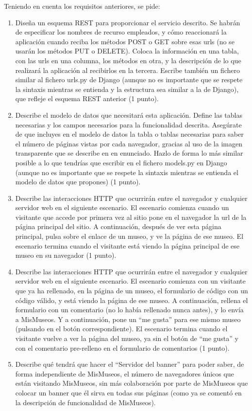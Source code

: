 Teniendo en cuenta los requisitos anteriores, se pide:

\begin{enumerate}
\item Diseña un esquema REST para proporcionar el servicio descrito. Se habrán de especificar los nombres de recurso empleados, y cómo reaccionará la aplicación cuando reciba los métodos POST o GET sobre esas urls (no se usarán los métodos PUT o DELETE). Coloca la información en una tabla, con las urls en una columna, los métodos en otra, y la descripción de lo que realizará la aplicación al recibirlos en la tercera. Escribe también un fichero similar al fichero urls.py de Django (aunque no es importante que se respete la sintaxis mientras se entienda y la estructura sea similar a la de Django), que refleje el esquema REST anterior (1 punto).

\item Describe el modelo de datos que necesitará esta aplicación. Define las tablas necesarias y los campos necesarios para la funcionalidad descrita. Asegúrate de que incluyes en el modelo de datos la tabla o tablas necesarias para saber el número de páginas vistas por cada navegador, gracias al uso de la imagen transparente que se describe en en enunciado. Hazlo de forma lo más similar posible a lo que tendrías que escribir en el fichero models.py en Django (aunque no es importante que se respete la sintaxis mientras se entienda el modelo de datos que propones) (1 punto).

\item Describe las interacciones HTTP que ocurrirán entre el navegador y cualquier servidor web en el siguiente escenario. El escenario comienza cuando un visitante que accede por primera vez al sitio pone en el navegador la url de la página principal del sitio. A continuación, después de ver esta página principal, pulsa sobre el enlace de un museo, y ve la página de ese museo. El escenario termina cuando el visitante está viendo la página principal de ese museo en su navegador (1 punto).

\item Describe las interacciones HTTP que ocurrirán entre el navegador y cualquier servidor web en el siguiente escenario. El escenario comienza con un visitante que ya ha rellenado, en la página de un museo, el formulario de código con un código válido, y está viendo la página de ese museo. A continuación, rellena el formulario con un comentario (no lo había rellenado nunca antes), y lo envía a MisMuseos. Y a continuación, pone un ``me gusta'' para ese mismo museo (pulsando en el botón correspondiente). El escenario termina cuando el visitante vuelve a ver la página del museo, ya sin el botón de ``me gusta'' y con el comentario pre-relleno en el formulario de comentarios (1 punto).

\item Describe qué tendrá que hacer el ``Servidor del banner'' para poder saber, de forma independiente de MisMuseos, el número de navegadores únicos que están visitando MisMuseos, sin más colaboración por parte de MisMuseos que colocar un banner que él sirva en todas sus páginas (como ya se comentó en la descripción de funcionalidad de MisMuseos).
\end{enumerate}

